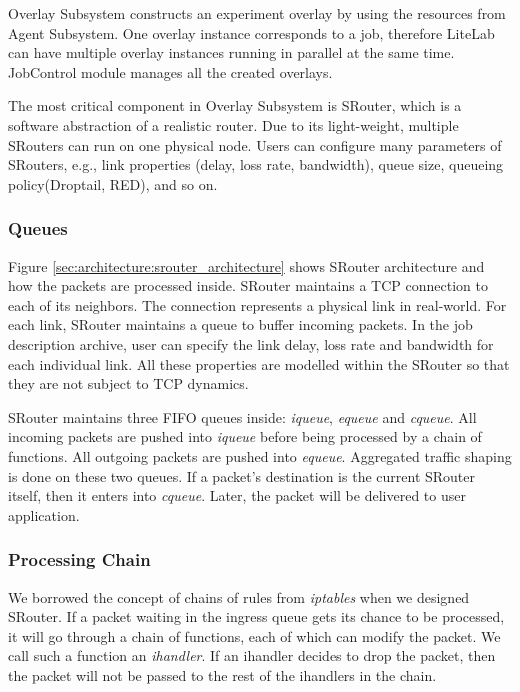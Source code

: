 \documentclass[conference]{IEEEtran}
\begin{document}
Overlay Subsystem constructs an experiment overlay by using the
resources from Agent Subsystem. One overlay instance corresponds to a
job, therefore LiteLab can have multiple overlay instances running in
parallel at the same time. JobControl module manages all the created
overlays.

The most critical component in Overlay Subsystem is SRouter, which is
a software abstraction of a realistic router. Due to its light-weight,
multiple SRouters can run on one physical node. Users can configure
many parameters of SRouters, e.g., link properties (delay, loss rate,
bandwidth), queue size, queueing policy(Droptail, RED), and so
on.

\subsubsection{Queues}
Figure \ref{sec:architecture:srouter_architecture} shows SRouter
architecture and how the packets are processed inside. SRouter
maintains a TCP connection to each of its neighbors. The connection
represents a physical link in real-world. For each link, SRouter
maintains a queue to buffer incoming packets. In the job description
archive, user can specify the link delay, loss rate and bandwidth for
each individual link. All these properties are modelled within the
SRouter so that they are not subject to TCP dynamics.

SRouter maintains three FIFO queues inside: \textit{iqueue},
\textit{equeue} and \textit{cqueue}. All incoming packets are pushed
into \textit{iqueue} before being processed by a chain of
functions. All outgoing packets are pushed into
\textit{equeue}. Aggregated traffic shaping is done on these two
queues.  If a packet's destination is the current SRouter itself, then
it enters into \textit{cqueue}.  Later, the packet will be delivered
to user application.

\subsubsection{Processing Chain}

We borrowed the concept of chains of rules from \textit{iptables} when
we designed SRouter. If a packet waiting in the ingress queue gets its
chance to be processed, it will go through a chain of functions, each
of which can modify the packet. We call such a function an
\textit{ihandler}. If an ihandler decides to drop the packet, then the
packet will not be passed to the rest of the ihandlers in the chain.
\end{document}
